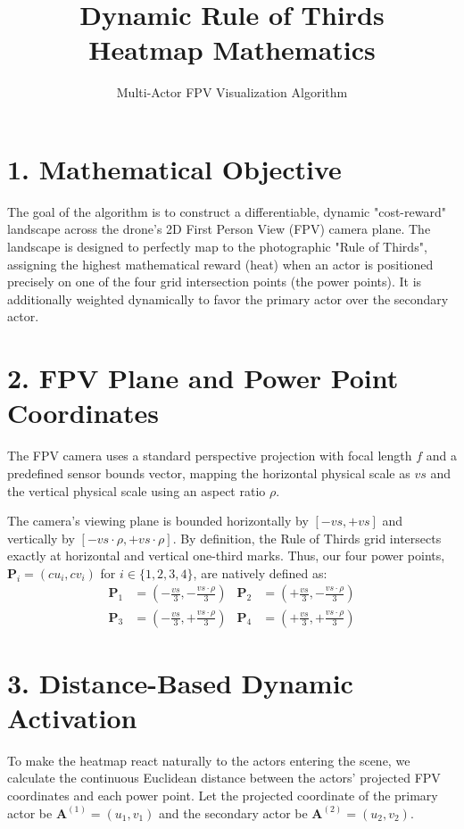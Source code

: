 \documentclass[12pt, a4paper]{article}
\title{\textbf{Dynamic Rule of Thirds\\Heatmap Mathematics}}
\author{Multi-Actor FPV Visualization Algorithm}
\date{}
\begin{document}
\maketitle

\section*{1. Mathematical Objective}
The goal of the algorithm is to construct a differentiable, dynamic "cost-reward" landscape across the drone's 2D First Person View (FPV) camera plane. The landscape is designed to perfectly map to the photographic "Rule of Thirds", assigning the highest mathematical reward (heat) when an actor is positioned precisely on one of the four grid intersection points (the power points). It is additionally weighted dynamically to favor the primary actor over the secondary actor.

\section*{2. FPV Plane and Power Point Coordinates}
The FPV camera uses a standard perspective projection with focal length $f$ and a predefined sensor bounds vector, mapping the horizontal physical scale as $vs$ and the vertical physical scale using an aspect ratio $\rho$. 

The camera's viewing plane is bounded horizontally by $\left[-vs, +vs\right]$ and vertically by $\left[-vs \cdot \rho, +vs \cdot \rho\right]$. By definition, the Rule of Thirds grid intersects exactly at horizontal and vertical one-third marks. Thus, our four power points, $\mathbf{P}_i = (cu_i, cv_i)$ for $i \in \{1,2,3,4\}$, are natively defined as:
\begin{align*}
\mathbf{P}_1 &= \left(-\frac{vs}{3}, -\frac{vs\cdot\rho}{3}\right) & \mathbf{P}_2 &= \left(+\frac{vs}{3}, -\frac{vs\cdot\rho}{3}\right) \\
\mathbf{P}_3 &= \left(-\frac{vs}{3}, +\frac{vs\cdot\rho}{3}\right) & \mathbf{P}_4 &= \left(+\frac{vs}{3}, +\frac{vs\cdot\rho}{3}\right)
\end{align*}

\section*{3. Distance-Based Dynamic Activation}
To make the heatmap react naturally to the actors entering the scene, we calculate the continuous Euclidean distance between the actors' projected FPV coordinates and each power point. Let the projected coordinate of the primary actor be $\mathbf{A}^{(1)} = (u_1, v_1)$ and the secondary actor be $\mathbf{A}^{(2)} = (u_2, v_2)$.
\end{document}
